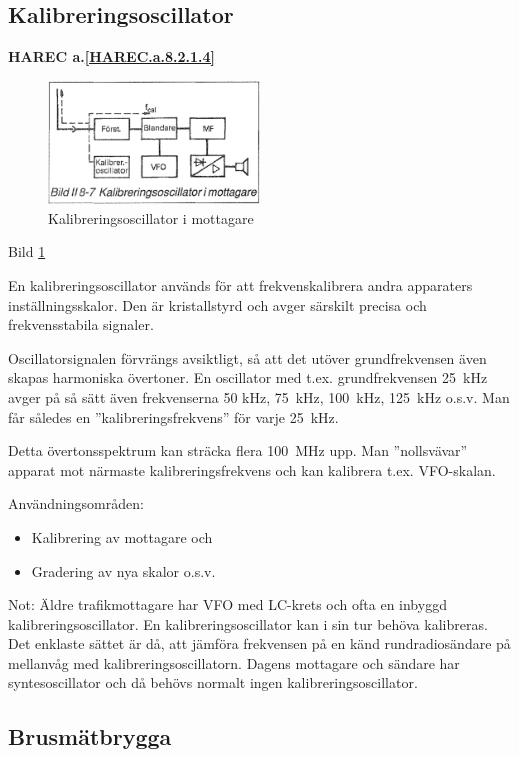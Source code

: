 \subsection{Kalibreringsoscillator}
\textbf{
HAREC a.\ref{HAREC.a.8.2.1.4}\label{myHAREC.a.8.2.1.4}
}

\begin{figure}
  \includegraphics[width=0.5\textwidth]{images/bild_2_8-07}
  \caption{Kalibreringsoscillator i mottagare}
  \label{fig:bildII8-7}
\end{figure}

Bild \ref{fig:bildII8-7}

En kalibreringsoscillator används för att frekvenskalibrera andra
apparaters inställningsskalor.  Den är kristallstyrd och avger
särskilt precisa och frekvensstabila signaler.

Oscillatorsignalen förvrängs avsiktligt, så att det utöver
grundfrekvensen även skapas harmoniska övertoner. En oscillator med
t.ex. grundfrekvensen 25~kHz avger på så sätt även frekvenserna 50
kHz, 75~kHz, 100~kHz, 125~kHz o.s.v. Man får således en
''kalibreringsfrekvens'' för varje 25~kHz.

Detta övertonsspektrum kan sträcka flera 100~MHz upp. Man
''nollsvävar'' apparat mot närmaste kalibreringsfrekvens och kan
kalibrera t.ex. VFO-skalan.

Användningsområden:
\begin{itemize}
\item Kalibrering av mottagare och
\item Gradering av nya skalor o.s.v.
\end{itemize}

Not: Äldre trafikmottagare har VFO med LC-krets och ofta en inbyggd
kalibreringsoscillator. En kalibreringsoscillator kan i sin tur behöva
kalibreras. Det enklaste sättet är då, att jämföra frekvensen på en
känd rundradiosändare på mellanvåg med kalibreringsoscillatorn.
Dagens mottagare och sändare har syntesoscillator och då behövs
normalt ingen kalibreringsoscillator.

\subsection{Brusmätbrygga}

